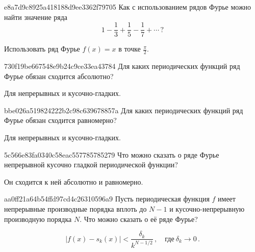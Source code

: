 \begin{note}{e8a7d9c8925a418188d9ee3362f79705}
    Как с использованием рядов Фурье можно найти значение ряда
    \[
        1 - \frac{1}{3} + \frac{1}{5} - \frac{1}{7} + \cdots\,?
    \]

    \begin{cloze}{1}
        Использовать ряд Фурье \({ f(x) = x }\) в точке \({ \frac{\pi}{2} }\).
    \end{cloze}
\end{note}

\begin{note}{730f19be667548e9b24c9ce33ea43784}
    Для каких периодических функций ряд Фурье обязан сходится абсолютно?

    \begin{cloze}{1}
        Для непрерывных и кусочно-гладких.
    \end{cloze}
\end{note}

\begin{note}{bbe026a519824222b2c98c639678857a}
    Для каких периодических функций ряд Фурье обязан сходится равномерно?

    \begin{cloze}{1}
        Для непрерывных и кусочно-гладких.
    \end{cloze}
\end{note}

\begin{note}{5c566e83fa0340c58eac557785785279}
    Что можно сказать о ряде Фурье непрерывной кусочно гладкой периодической функции?

    \begin{cloze}{1}
        Он сходится к ней абсолютно и равномерно.
    \end{cloze}
\end{note}

\begin{note}{aa0ff21a64b54ffd97cd4c26310596a9}
    Пусть периодическая функция \({ f }\) имеет непрерывные производные порядка вплоть до \({ N - 1 }\) и кусочно-непрерывную производную порядка \({ N }\).
    Что можно сказать о её ряде Фурье?

    \begin{cloze}{1}
        \[
            \left\lvert f(x) - s_k(x) \right\rvert < \frac{\delta_k}{k^{N - 1/2}}\,, \quad \text{где}\ \delta_k \to 0\,.
        \]
    \end{cloze}
\end{note}

